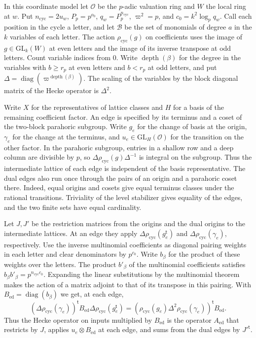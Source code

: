 In this coordinate model let \(\mathcal O\) be the \(p\)-adic valuation
ring and \(W\) the local ring at \(w\). Put \(n_\mathrm{cyc}=2u_w\),
\(P_p=p^{o_0}\), \(q_w=P_p^{n_\mathrm{cyc}}\), \(\varpi^2=p\), and
\(c_0=k^2\log_p q_w\).
Call each position in the cycle a letter, and let \(\mathcal B\) be the
set of monomials of degree \(a\) in the \(k\) variables of each letter.
The action \(\rho_\mathrm{cyc}(g)\) on coefficients uses the image of
\(g\in\mathrm{GL}_k(W)\) at even letters and the image of its inverse
transpose at odd letters. Count variable indices from \(0\).
Write \(\operatorname{depth}(\beta)\) for the degree in the variables
with \(b\ge r_p\) at even letters and \(b<r_p\) at odd letters, and put
\(\Delta=\operatorname{diag}(\varpi^{\operatorname{depth}(\beta)})\).
The scaling of the variables by the block diagonal matrix of the Hecke
operator is \(\Delta^2\).

Write \(X\) for the representatives of lattice classes and \(H\) for
a basis of the remaining coefficient factor. An edge is specified by
its terminus and a coset of the two-block parahoric subgroup.
Write \(g_e\) for the change of basis at the origin, \(\gamma_e\)
for the change at the terminus, and \(u_e\in\mathrm{GL}_H(\mathcal O)\)
for the transition on the other factor. In the parahoric subgroup,
entries in a shallow row and a deep column are divisible by \(p\),
so \(\Delta\rho_\mathrm{cyc}(g)\Delta^{-1}\) is integral on the subgroup.
Thus the intermediate lattice of each edge is independent of the
basis representative. The dual edges also run once through the
pairs of an origin and a parahoric coset there. Indeed, equal
origins and cosets give equal terminus classes under the rational
transitions. Triviality of the level stabilizer gives equality of
the edges, and the two finite sets have equal cardinality.

Let \(J,J'\) be the restriction matrices from the origins and the
dual origins to the intermediate lattices.
At an edge they apply \(\Delta\rho_\mathrm{cyc}(g_e^{\mathsf t})\)
and \(\Delta\rho_\mathrm{cyc}(\gamma_e)\), respectively.
Use the inverse multinomial coefficients as diagonal pairing
weights in each letter and clear denominators by \(p^{c_0}\).
Write \(b_\beta\) for the product of these weights over the letters.
The product \(b'_\beta\) of the multinomial coefficients satisfies
\(b_\beta b'_\beta=p^{n_\mathrm{cyc}c_0}\).
Expanding the linear substitutions by the multinomial theorem makes
the action of a matrix adjoint to that of its transpose in this pairing.
With \(B_\mathrm{ed}=\operatorname{diag}(b_\beta)\) we get, at each edge,
\[
 (\Delta\rho_\mathrm{cyc}(\gamma_e))^{\mathsf t}B_\mathrm{ed}
       \Delta\rho_\mathrm{cyc}(g_e^{\mathsf t})
   =(\rho_\mathrm{cyc}(g_e)\Delta^2\rho_\mathrm{cyc}(\gamma_e))^{\mathsf t}B_\mathrm{ed}.
\]
Thus the Hecke operator on inputs multiplied by \(B_\mathrm{ed}\) is
the operator \(A_\mathrm{ed}\) that restricts by \(J\), applies
\(u_e\otimes B_\mathrm{ed}\) at each edge, and sums from the dual edges
by \(J'^{\mathsf t}\).


